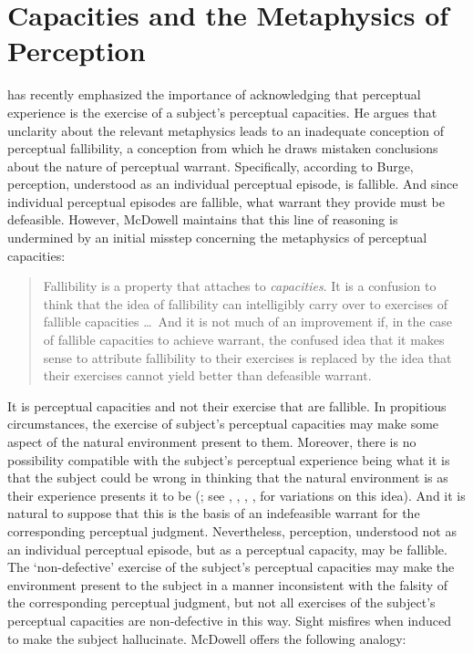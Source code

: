 \documentclass[12pt]{article}
\begin{document}

\section{Capacities and the Metaphysics of Perception} %
\label{sec:capacities_and_the_metaphysics_of_perception}

\citet{McDowell:2010fk} has recently emphasized the importance of acknowledging that perceptual experience is the exercise of a subject's perceptual capacities. He argues that unclarity about the relevant metaphysics leads \citet{Burge:2005uq} to an inadequate conception of perceptual fallibility, a conception from which he draws mistaken conclusions about the nature of perceptual warrant. Specifically, according to Burge, perception, understood as an individual perceptual episode, is fallible. And since individual perceptual episodes are fallible, what warrant they provide must be defeasible. However, McDowell maintains that this line of reasoning is undermined by an initial misstep concerning the metaphysics of perceptual capacities:
\begin{quote}
	Fallibility is a property that attaches to \emph{capacities}. It is a confusion to think that the idea of fallibility can intelligibly carry over to exercises of fallible capacities \ldots\ And it is not much of an improvement if, in the case of fallible capacities to achieve warrant, the confused idea that it makes sense to attribute fallibility to their exercises is replaced by the idea that their exercises cannot yield better than defeasible warrant. \citep[245]{McDowell:2010fk}
\end{quote}
It is perceptual capacities and not their exercise that are fallible. In propitious circumstances, the exercise of subject's perceptual capacities may make some aspect of the natural environment present to them. Moreover, there is no possibility compatible with the subject's perceptual experience being what it is that the subject could be wrong in thinking that the natural environment is as their experience presents it to be (\citealt[245]{McDowell:2010fk}; see \citealt{Brewer:2011ks},  \citealt{Johnston:2006uq,Johnston:2011fk}, \citealt{Kalderon:2011fk}, \citealt{Kalderon:2010fk}, \citealt{Travis:2005kx} for variations on this idea). And it is natural to suppose that this is the basis of an indefeasible warrant for the corresponding perceptual judgment. Nevertheless, perception, understood not as an individual perceptual episode, but as a perceptual capacity, may be fallible. The `non-defective' exercise of the subject's perceptual capacities may make the environment present to the subject in a manner inconsistent with the falsity of the corresponding perceptual judgment, but not all exercises of the subject's perceptual capacities are non-defective in this way. Sight misfires when induced to make the subject hallucinate. McDowell offers the following analogy:
\end{document}
